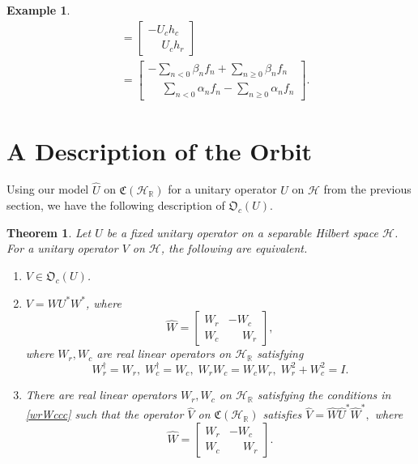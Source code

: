 \documentclass{dis}
\newcommand{\phm}{\phantom{-}}
\theoremstyle{plain}
\newtheorem{Theorem}[equation]{Theorem}
\theoremstyle{definition}
\newtheorem{Example}[equation]{Example}
\def\R{\mathbb{R}}
\renewcommand{\geq}{\geqslant}
\newcommand{\0}{{\color{lightgray}0}}
\begin{document}
\begin{Example}
\begin{align*}
& = \begin{bmatrix} -  U_c h_c \\  \phm U_{c} h_r\end{bmatrix}\\
& = \begin{bmatrix} - \sum_{n < 0} \beta_n f_n + \sum_{n \geq 0} \beta_n f_n\\
\phantom{-}\sum_{n < 0} \alpha_n f_n - \sum_{n \geq 0} \alpha_n f_n 
\end{bmatrix}.
\end{align*}
\end{Example}

\section{A Description of the Orbit}

Using our model $\widehat{U}$ on $\mathfrak{C}(\mathcal{H}_{\R})$ for a unitary operator $U$ on $\mathcal{H}$ from the  previous section, we have the following description of $\mathfrak{O}_c(U)$. 

\begin{Theorem}
Let $U$ be a fixed unitary operator on a separable Hilbert space $\mathcal{H}$. For a unitary operator $V$ on $\mathcal{H}$, the following are equivalent.
\begin{enumerate}
\item[(a)] $V \in \mathfrak{O}_c(U)$.
\item[(b)] $V = W U^{*} W^{*}$, where
$$\widehat{W} = \begin{bmatrix} W_{r} & -W_{c}\\ W_{c} & \phm W_{r}\end{bmatrix},$$
where $W_{r}, W_{c}$ are real linear operators on $\mathcal{H}_{\R}$ satisfying
\begin{equation}\label{wrWccc}
W_{r}^{\dagger} = W_{r}, \; W_{c}^{\dagger} = W_{c}, \; W_{r} W_{c} = W_{c} W_{r}, \;  W_{r}^{2} + W_{c}^{2} = I.
\end{equation}
\item[(c)] There are real linear operators $W_{r}, W_{c}$  on $\mathcal{H}_{\R}$ satisfying  the conditions in \eqref{wrWccc} such that the operator $\widehat{V}$ on $\mathfrak{C}(\mathcal{H}_{\R})$ satisfies 
$\widehat{V} = \widehat{W} \widehat{U}^{*} \widehat{W}^{*},$ where
$$\widehat{W} = \begin{bmatrix} W_{r} & -W_{c}\\ W_{c} & \phm W_{r}\end{bmatrix}.$$
\end{enumerate}
\end{Theorem}
\end{document}
